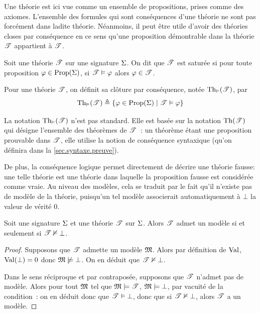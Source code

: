 Une théorie est ici vue comme un ensemble de propositions, prises comme des
axiomes. L'ensemble des formules qui sont conséquences d'une théorie ne sont
pas forcément dans ladite théorie. Néanmoins, il peut être utile d'avoir des
théories closes par conséquence en ce sens qu'une proposition démontrable dans
la théorie $\mathscr T$ appartient à $\mathscr T$.

\begin{definition}
  Soit une théorie $\mathscr T$ sur une signature $\Sigma$. On dit que
  $\mathscr T$ est saturée si pour toute proposition $\varphi\in\operatorname{Prop}(\Sigma)$,
  si $\mathscr T\vDash \varphi$ alors $\varphi\in \mathscr T$.

  Pour une théorie $\mathscr T$, on définit sa clôture par conséquence, notée
  $\operatorname{Th}_{\vDash}(\mathscr T)$, par
  \[\operatorname{Th}_{\vDash}(\mathscr T) \triangleq \left\{ \varphi \in \operatorname{Prop}(\Sigma) \;\middle\vert\; \mathscr T \vDash \varphi \right\}\]
\end{definition}

\begin{remark}
  La notation $\operatorname{Th}_{\vDash}(\mathscr T)$ n'est pas standard. Elle est basée sur la notation
  $\operatorname{Th}(\mathscr T)$ qui désigne l'ensemble des théorèmes de $\mathscr T$~: un théorème
  étant une proposition prouvable dans $\mathscr T$, elle utilise la notion de
  conséquence syntaxique (qu'on définira dans la \cref{sec.syntaxe.preuve}).
\end{remark}

De plus, la conséquence logique permet directement de décrire une théorie
\og fausse\fg: une telle théorie est une théorie dans laquelle la proposition
fausse est considérée comme vraie. Au niveau des modèles, cela se traduit par le
fait qu'il n'existe pas de modèle de la théorie, puisqu'un tel modèle
associerait automatiquement à $\bot$ la valeur de vérité $0$.

\begin{proposition}
  Soit une signature $\Sigma$ et une théorie $\mathscr T$ sur $\Sigma$. Alors
  $\mathscr T$ admet un modèle si et seulement si $\mathscr T \nvDash \bot$.
\end{proposition}

\begin{proof}
  Supposons que $\mathscr T$ admette un modèle $\mathfrak{M}$. Alors par
  définition de $\operatorname{Val}$, $\operatorname{Val}(\bot) = 0$ donc $\mathfrak{M}\not\models \bot$. On
  en déduit que $\mathscr T\nvDash\bot$.

  Dans le sens réciproque et par contraposée, supposons que $\mathscr T$ n'admet
  pas de modèle. Alors pour tout $\mathfrak{M}$ tel que
  $\mathfrak{M}\models \mathscr T$, $\mathfrak{M}\models \bot$, par vacuité de la
  condition~: on en déduit donc que $\mathscr T \vDash \bot$, donc que si
  $\mathscr T \nvDash\bot$, alors $\mathscr T$ a un modèle.
\end{proof}

